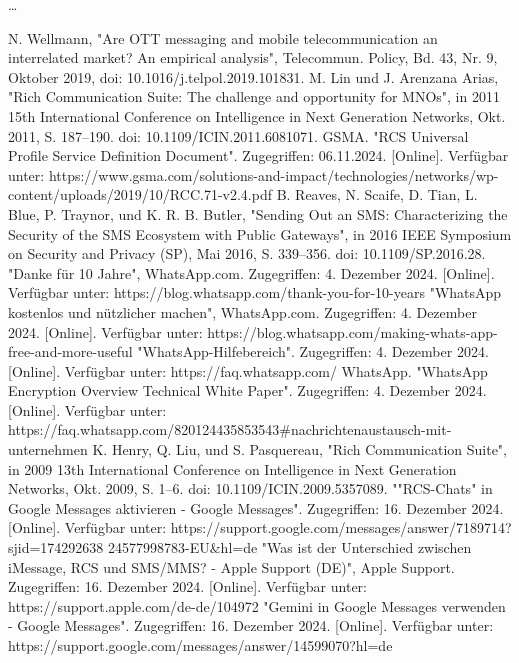\documentclass[conference]{IEEEtran}
\begin{document}
\dots

\begin{thebibliography}{00}
     N. Wellmann, "Are OTT messaging and mobile telecommunication an interrelated market? An empirical analysis", Telecommun. Policy, Bd. 43, Nr. 9, Oktober 2019, doi: 10.1016/j.telpol.2019.101831.
     M. Lin und J. Arenzana Arias, "Rich Communication Suite: The challenge and opportunity for MNOs", in 2011 15th International Conference on Intelligence in Next Generation Networks, Okt. 2011, S. 187–190. doi: 10.1109/ICIN.2011.6081071.
     GSMA. "RCS Universal Profile Service Definition Document". Zugegriffen: 06.11.2024. [Online]. Verfügbar unter: https://www.gsma.com/solutions-and-impact/technologies/networks/wp-content/uploads/2019/10/RCC.71-v2.4.pdf
     B. Reaves, N. Scaife, D. Tian, L. Blue, P. Traynor, und K. R. B. Butler, "Sending Out an SMS: Characterizing the Security of the SMS Ecosystem with Public Gateways", in 2016 IEEE Symposium on Security and Privacy (SP), Mai 2016, S. 339–356. doi: 10.1109/SP.2016.28.
     "Danke für 10 Jahre", WhatsApp.com. Zugegriffen: 4. Dezember 2024. [Online]. Verfügbar unter: https://blog.whatsapp.com/thank-you-for-10-years
     "WhatsApp kostenlos und nützlicher machen", WhatsApp.com. Zugegriffen: 4. Dezember 2024. [Online]. Verfügbar unter: https://blog.whatsapp.com/making-whats-app-free-and-more-useful
     "WhatsApp-Hilfebereich". Zugegriffen: 4. Dezember 2024. [Online]. Verfügbar unter: https://faq.whatsapp.com/
     WhatsApp. "WhatsApp Encryption Overview Technical White Paper". Zugegriffen: 4. Dezember 2024. [Online]. Verfügbar unter: https://faq.whatsapp.com/820124435853543\#nachrichtenaustausch-mit-unternehmen
     K. Henry, Q. Liu, und S. Pasquereau, "Rich Communication Suite", in 2009 13th International Conference on Intelligence in Next Generation Networks, Okt. 2009, S. 1–6. doi: 10.1109/ICIN.2009.5357089.
     ""RCS-Chats" in Google Messages aktivieren - Google Messages". Zugegriffen: 16. Dezember 2024. [Online]. Verfügbar unter: https://support.google.com/messages/answer/7189714?sjid=174292638
    24577998783-EU\&hl=de
     "Was ist der Unterschied zwischen iMessage, RCS und SMS/MMS? - Apple Support (DE)", Apple Support. Zugegriffen: 16. Dezember 2024. [Online]. Verfügbar unter: https://support.apple.com/de-de/104972
     "Gemini in Google Messages verwenden - Google Messages". Zugegriffen: 16. Dezember 2024. [Online]. Verfügbar unter: https://support.google.com/messages/answer/14599070?hl=de

\end{thebibliography}
\end{document}
